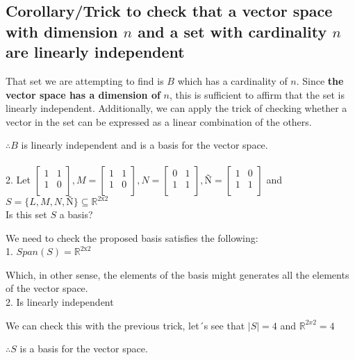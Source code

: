 \documentclass{article}
\begin{document}
\subsection*{Corollary/Trick to check that a vector space with dimension \(n\) and a set with cardinality \(n\) are linearly independent}

That set we are attempting to find is \(B\) which has a cardinality of \(n\). Since \textbf{the vector space has a dimension of }\(n\), this is sufficient to affirm that the set is linearly independent. Additionally, we can apply the trick of checking whether a vector in the set can be expressed as a linear combination of the others.

\(\therefore B\) is linearly independent and is a basis for the vector space.
\\
\\
2. Let \(\begin{bmatrix}
    1 & 1\\
    1 & 0\\
\end{bmatrix}, M = \begin{bmatrix}
    1 & 1\\
    1 & 0\\
\end{bmatrix}, N = \begin{bmatrix}
    0 & 1\\
    1 & 1\\
\end{bmatrix}, Ñ = \begin{bmatrix}
    1 & 0\\
    1 & 1\\
\end{bmatrix}\) 
and \(S = \{ L,M,N,Ñ \} \subseteq \mathbb{R}^{2\text{x}2}\)
\\

Is this set \(S\) a basis?

We need to check the proposed basis satisfies the following:
\\

1. \(Span(S) = \mathbb{R}^{2 \text{x} 2}\)

Which, in other sense, the elements of the basis might generates all the elements of the vector space.
\\

2. Is linearly independent

We can check this with the previous trick, let´s see that \(|S| = 4\) and \(\mathbb{R}^{2x2} = 4\)

\(\therefore S\) is a basis for the vector space.
\end{document}
